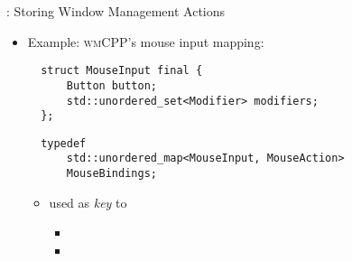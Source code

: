 \begin{frame}[fragile]{\underline{\cpp}: Storing Window Management Actions \hfill {\footnotesize \currentname}}


    \begin{itemize}

        \item Example: \textsc{wmCPP}'s mouse input mapping:\\[3pt]
\begin{verbatim}
  struct MouseInput final {
      Button button;
      std::unordered_set<Modifier> modifiers;
  };
\end{verbatim}
\begin{verbatim}
  typedef
      std::unordered_map<MouseInput, MouseAction>
      MouseBindings;
\end{verbatim}

    \vspace*{5pt}\begin{itemize}

        \item {} used as \textit{key} to 
            \begin{itemize}
                \item {}
                \item {}
            \end{itemize}

    \end{itemize}

    \end{itemize}

    \vfill

\end{frame}


